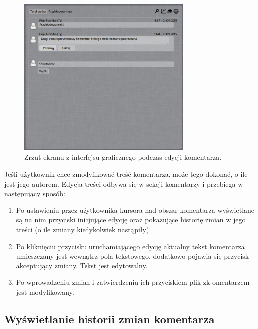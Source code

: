\documentclass[polish,a4paper,twoside]{ppfcmthesis}
\begin{document}
\begin{figure}[h!]
  \vspace{5pt}
  \begin{center}
    \includegraphics[width=240pt]{figures/screenshoteditcomment1.png}
  \end{center}
  \caption{Zrzut ekranu z interfejsu graficznego podczas edycji komentarza.}
\end{figure}

Jeśli użytkownik chce zmodyfikować treść komentarza, może tego dokonać, o ile jest jego autorem. Edycja treści odbywa się w sekcji komentarzy i przebiega w następujący sposób:

\begin{enumerate}[noitemsep]
  \item Po ustawieniu przez użytkownika kursora nad obszar komentarza wyświetlane są na nim przyciski inicjujące edycję oraz pokazujące historię zmian w jego treści (o ile zmiany kiedykolwiek nastąpiły).
  
  \item Po kliknięciu przycisku uruchamiającego edycję aktualny tekst komentarza umieszczany jest wewnątrz pola tekstowego, dodatkowo pojawia się przycisk akceptujący zmiany. Tekst jest edytowalny.
  
  \item Po wprowadzeniu zmian i zatwierdzeniu ich przyciskiem plik zk omentarzem jest modyfikowany.
\end{enumerate}

\newpage

\subsection*{Wyświetlanie historii zmian komentarza}
\end{document}
